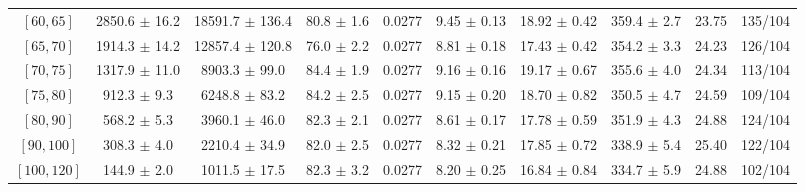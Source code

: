 \begin{tabular}{c||c|c|c|c|c|c|c||c|c}
$[60, 65]$ & 2850.6 $\pm$ 16.2 & 18591.7 $\pm$ 136.4 & 80.8 $\pm$ 1.6 & 0.0277 & 9.45 $\pm$ 0.13 & 18.92 $\pm$ 0.42 & 359.4 $\pm$ 2.7 & 23.75 & 135/104\\
$[65, 70]$ & 1914.3 $\pm$ 14.2 & 12857.4 $\pm$ 120.8 & 76.0 $\pm$ 2.2 & 0.0277 & 8.81 $\pm$ 0.18 & 17.43 $\pm$ 0.42 & 354.2 $\pm$ 3.3 & 24.23 & 126/104\\
$[70, 75]$ & 1317.9 $\pm$ 11.0 & 8903.3 $\pm$ 99.0 & 84.4 $\pm$ 1.9 & 0.0277 & 9.16 $\pm$ 0.16 & 19.17 $\pm$ 0.67 & 355.6 $\pm$ 4.0 & 24.34 & 113/104\\
$[75, 80]$ & 912.3 $\pm$ 9.3 & 6248.8 $\pm$ 83.2 & 84.2 $\pm$ 2.5 & 0.0277 & 9.15 $\pm$ 0.20 & 18.70 $\pm$ 0.82 & 350.5 $\pm$ 4.7 & 24.59 & 109/104\\
$[80, 90]$ & 568.2 $\pm$ 5.3 & 3960.1 $\pm$ 46.0 & 82.3 $\pm$ 2.1 & 0.0277 & 8.61 $\pm$ 0.17 & 17.78 $\pm$ 0.59 & 351.9 $\pm$ 4.3 & 24.88 & 124/104\\
$[90, 100]$ & 308.3 $\pm$ 4.0 & 2210.4 $\pm$ 34.9 & 82.0 $\pm$ 2.5 & 0.0277 & 8.32 $\pm$ 0.21 & 17.85 $\pm$ 0.72 & 338.9 $\pm$ 5.4 & 25.40 & 122/104\\
$[100, 120]$ & 144.9 $\pm$ 2.0 & 1011.5 $\pm$ 17.5 & 82.3 $\pm$ 3.2 & 0.0277 & 8.20 $\pm$ 0.25 & 16.84 $\pm$ 0.84 & 334.7 $\pm$ 5.9 & 24.88 & 102/104\\
\end{tabular}
